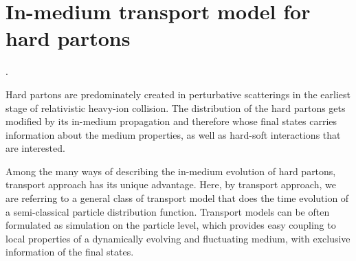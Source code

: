 \chapter{In-medium transport model for hard partons}
\cite{ATLAS-Collaboration:2012iwa,Abelevetal:2014dna,STAR:upgrade-hf,Adare:2015kwa,CMS:2017dec}
\cite{Wang:1994fx,Zakharov:1996fv,Baier:1996sk,Zakharov:1997uu,Arnold:2002zm,Gyulassy:2003mc,Kovner:2003zj,Jeon:2003gi,CasalderreySolana:2007pr,Djordjevic:2008iz,Bass:2008rv,Schenke:2009gb,Majumder:2009zu,Majumder:2010qh,Armesto:2011ht,Zapp:2011ya,Ovanesyan:2011xy,Kang:2014xsa,Cao:2016gvr,Kauder:2018cdt,Cao:2017zih}.

Hard partons are predominately created in perturbative scatterings in the earliest stage of relativistic heavy-ion collision.
The distribution of the hard partons gets modified by its in-medium propagation and therefore whose final states carries information about the medium properties, as well as hard-soft interactions that are interested.

Among the many ways of describing the in-medium evolution of hard partons, 
transport approach has its unique advantage. 
Here, by transport approach, we are referring to a general class of transport model that does the time evolution of a semi-classical particle distribution function.
Transport models can be often formulated as simulation on the particle level, which provides easy coupling to local properties of a dynamically evolving and fluctuating medium, with exclusive information of the final states.


